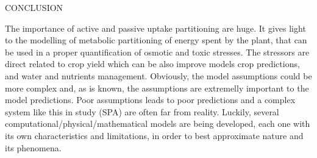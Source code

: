 \cleardoublepage
\chap CONCLUSION

{\tred The importance of active and passive uptake partitioning are huge.
It gives light to the modelling of metabolic partitioning of energy spent by the plant, that can be used in a proper quantification of osmotic and toxic stresses.
The stressors are direct related to crop yield which can be also improve models crop predictions, and water and nutrients management.
Obviously, the model assumptions could be more complex and, as is known, the assumptions are extremelly important to the model predictions.
Poor assumptions leads to poor predictions and a complex system like this in study (SPA) are often far from reality.
Luckily, several computational/physical/mathematical models are being developed, each one with its own characteristics and limitations, in order to best approximate nature and its phenomena.
}




